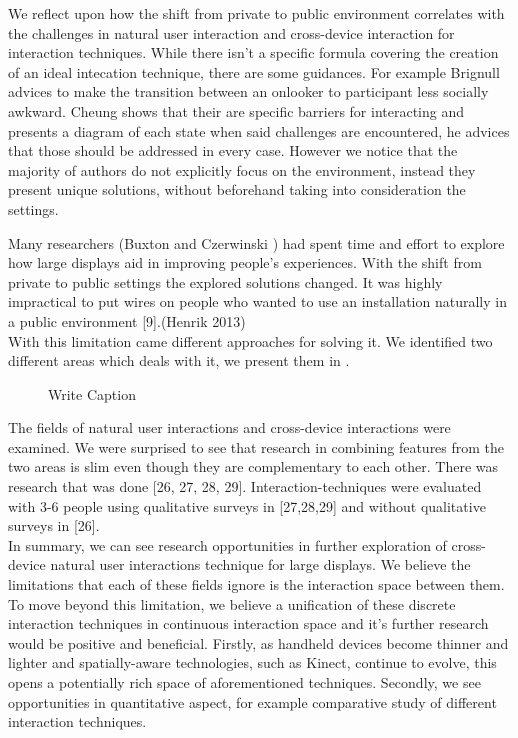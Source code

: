 We reflect upon how the shift from private to public environment correlates with the challenges in natural user interaction and cross-device interaction for interaction techniques.
While there isn't a specific formula covering the creation of an ideal intecation technique, there are some guidances. For example Brignull advices to make the transition between an onlooker to participant less socially awkward. Cheung shows that their are specific barriers for interacting and presents a diagram of each state when said challenges are encountered, he advices that those should be addressed in every case. However we notice that the majority of authors do not explicitly focus on the environment, instead they present unique solutions, without beforehand taking into consideration the settings. 

Many researchers (Buxton and Czerwinski ) had spent time and effort to explore how large displays aid in improving people's experiences. 
With the shift from private to public settings the explored solutions changed. 
It was highly impractical to put wires on people who wanted to use an installation naturally in a public environment [9].(Henrik 2013)\\

With this limitation came different approaches for solving it. 
We identified two different areas which deals with it, we present them in .
\begin{figure}[h!]
\centering
{}
\caption{Write Caption}
\label{fig:litreview}
\end{figure}
The fields of natural user interactions and cross-device interactions were examined. 
We were surprised to see that research in combining features from the two areas is slim even though they are complementary to each other. 
There was research that was done [26, 27, 28, 29]. 
Interaction-techniques were evaluated with 3-6 people using qualitative surveys in [27,28,29] and without qualitative surveys in [26].\\

In summary, we can see research opportunities in further exploration of cross-device natural user interactions technique for large displays. We believe the limitations that each of these fields ignore is the interaction space between them. To move beyond this limitation, we believe a unification of these discrete interaction techniques in continuous interaction space and it's further research would be positive and beneficial.
Firstly, as handheld devices become thinner and lighter and spatially-aware technologies, such as Kinect, continue to evolve, this opens a potentially rich space of aforementioned techniques. 
Secondly, we see opportunities in quantitative aspect, for example comparative study of different interaction techniques. 
